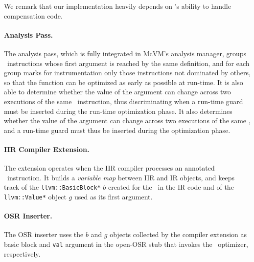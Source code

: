 \noindent We remark that our implementation heavily depends on \osrkit's ability to handle compensation code. 

\ifdefined \fullver
\paragraph{Analysis Pass.} The analysis pass, which is fully integrated in McVM's analysis manager, groups \feval\ instructions whose first argument is reached by the same definition, and for each group marks for instrumentation only those instructions not dominated by others, so that the function can be optimized as early as possible at run-time. 
\ifdefined \fullver
It is also able to determine whether the value of the argument can change across two executions of the same \feval\ instruction, thus discriminating when a run-time guard must be inserted during the run-time optimization phase.
\else
It also determines whether the value of the argument can change across two executions of the same \feval, and a run-time guard must thus be inserted during the optimization phase.
\fi

\paragraph{IIR Compiler Extension.}
The extension operates when the IIR compiler processes an annotated \feval\ instruction. It builds a {\em variable map} between IIR and IR objects, and keeps track of the {\tt llvm::BasicBlock*} $b$ created for the \feval\  in the IR code and of the {\tt llvm::Value*} object $g$ used as its first argument. 

\paragraph{OSR Inserter.}
The OSR inserter uses the $b$ and $g$ objects collected by the compiler extension as basic block and {\tt val} argument in the open-OSR stub that invokes the \feval\ optimizer, respectively.
\fi


\newcommand{\gBase}{$f$}
\newcommand{\gOpt}{$f_{opt}$}
\newcommand{\gIIR}{$f^{IIR}$}
\newcommand{\gIR}{$f^{IR}$}
\newcommand{\gOptIIR}{$f^{IIR}_{opt}$}
\newcommand{\gOptIR}{$f^{IR}_{opt}$}

